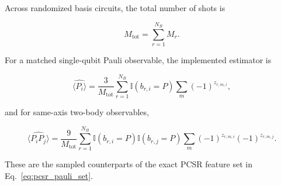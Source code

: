 \documentclass[final,1p,times]{elsarticle}
\begin{document}
Across randomized basis circuits, the total number of shots is

\begin{equation}
M_{\mathrm{tot}}
=
\sum_{r=1}^{N_B}M_r.
\end{equation}

For a matched single-qubit Pauli observable, the implemented estimator
is

\begin{equation}
\widehat{\langle P_i\rangle}
=
\frac{3}{M_{\mathrm{tot}}}
\sum_{r=1}^{N_B}
\mathbb I(b_{r,i}=P)
\sum_m
(-1)^{z_{r,m,i}},
\label{eq:ibm_shadow_one}
\end{equation}

and for same-axis two-body observables,

\begin{equation}
\widehat{\langle P_iP_j\rangle}
=
\frac{9}{M_{\mathrm{tot}}}
\sum_{r=1}^{N_B}
\mathbb I(b_{r,i}=P)
\mathbb I(b_{r,j}=P)
\sum_m
(-1)^{z_{r,m,i}}
(-1)^{z_{r,m,j}}.
\label{eq:ibm_shadow_two}
\end{equation}

These are the sampled counterparts of the exact PCSR feature set in
Eq.~\eqref{eq:pcsr_pauli_set}.
\end{document}
